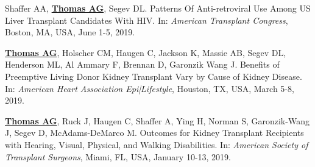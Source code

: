 \documentclass[10pt]{article}
\makeatletter
\newlength{\bibhang}
\newlength{\bibsep}
 {\@listi \global\bibsep\itemsep \global\advance\bibsep by\parsep}
\newenvironment{bibenum*}
  {\renewcommand\labelenumi{[\theenumi]}%
   \etaremune[
     topsep=0pt,
     itemsep=\bibsep,
     parsep=0pt,partopsep=0pt,
     itemindent=-\bibhang,
     leftmargin={\bibhang+\widthof{[999]}}]}
  {\endetaremune}
\makeatother
\begin{document}
\begin{bibenum*}
\item Shaffer AA, \underline{\textbf{Thomas AG}}, Segev DL.
  Patterns Of Anti-retroviral Use Among US Liver Transplant
  Candidates With HIV.
  In: \emph{American Transplant Congress},
  Boston, MA, USA, June 1-5, 2019.

\item \underline{\textbf{Thomas AG}}, Holscher CM, Haugen C, Jackson K, Massie AB,
  Segev DL, Henderson ML, Al Ammary F, Brennan D, Garonzik Wang J.
  Benefits of Preemptive Living Donor Kidney Transplant Vary by
  Cause of Kidney Disease.
  In: \emph{American Heart Association Epi|Lifestyle},
  Houston, TX, USA, March 5-8, 2019.

\item \underline{\textbf{Thomas AG}}, Ruck J, Haugen C, Shaffer A, Ying H,
  Norman S, Garonzik-Wang J, Segev D, McAdams-DeMarco M.
  Outcomes for Kidney Transplant Recipients with Hearing, Visual,
  Physical, and Walking Disabilities.
  In: \emph{American Society of Transplant Surgeons},
  Miami, FL, USA, January 10-13, 2019.






\end{bibenum*}
\end{document}
